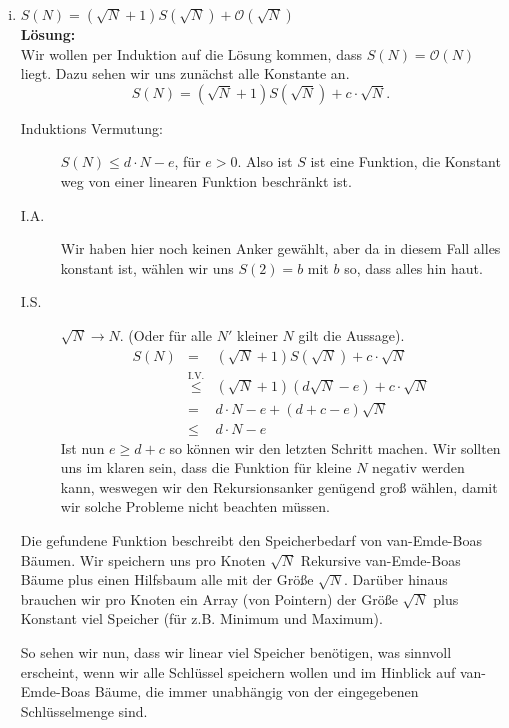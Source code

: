 \documentclass[11pt,a4paper,ngerman]{article}
\begin{document}
\begin{enumerate}[(i)]
	\item $S(N) = \left( \sqrt{N} + 1 \right) S( \sqrt{N}) + \mathcal{O}(\sqrt{N})$\\
	\noindent\textbf{Lösung:}\\
		Wir wollen per Induktion auf die Lösung kommen, dass $S(N) = \mathcal{O}(N)$ liegt. Dazu sehen wir uns zunächst alle Konstante
		an.
		$$
		S(N) = (\sqrt{N} + 1 ) S( \sqrt{N}) + c \cdot \sqrt{N}.
		$$
		\begin{description}
			\item[Induktions Vermutung:] $S(N) \leq d \cdot N - e$, für $e > 0$. Also ist $S$ ist eine Funktion, die Konstant weg
			von einer linearen Funktion beschränkt ist.
			\item[I.A.] Wir haben hier noch keinen Anker gewählt, aber da in diesem Fall alles konstant ist, wählen wir uns
				$S(2) = b$ mit $b$ so, dass alles hin haut.
			\item[I.S.] $\sqrt{N} \rightarrow N$. (Oder für alle $N'$ kleiner $N$ gilt die Aussage).\\
				$$\begin{array}{rcl}
					S(N) &=& (\sqrt{N} + 1) S(\sqrt{N}) + c \cdot \sqrt{N}\\
						&\stackrel{\text{I.V.}}{\leq}& (\sqrt{N} + 1) (d \sqrt{N} - e) + c \cdot \sqrt{N}\\
						&=& d \cdot N - e + (d + c - e) \sqrt{N}\\
						&\leq& d \cdot N - e
				\end{array}$$
				Ist nun $e \geq d +c$ so können wir den letzten Schritt machen. Wir sollten uns im klaren sein,
				dass die Funktion für kleine $N$ negativ werden kann, weswegen wir den Rekursionsanker genügend groß
				wählen, damit wir solche Probleme nicht beachten müssen.
		\end{description}

		Die gefundene Funktion beschreibt den Speicherbedarf von van-Emde-Boas Bäumen. Wir speichern uns pro Knoten
		$\sqrt{N}$ Rekursive van-Emde-Boas Bäume plus einen Hilfsbaum alle mit der Größe $\sqrt{N}$. Darüber hinaus
		brauchen wir pro Knoten ein Array (von Pointern) der Größe $\sqrt{N}$ plus Konstant viel Speicher (für z.B. Minimum und Maximum).
		
		So sehen wir nun, dass wir linear viel Speicher benötigen, was sinnvoll erscheint, wenn wir alle Schlüssel speichern wollen und im Hinblick
		auf van-Emde-Boas Bäume, die immer unabhängig von der eingegebenen Schlüsselmenge sind.
\end{enumerate}
\end{document}
